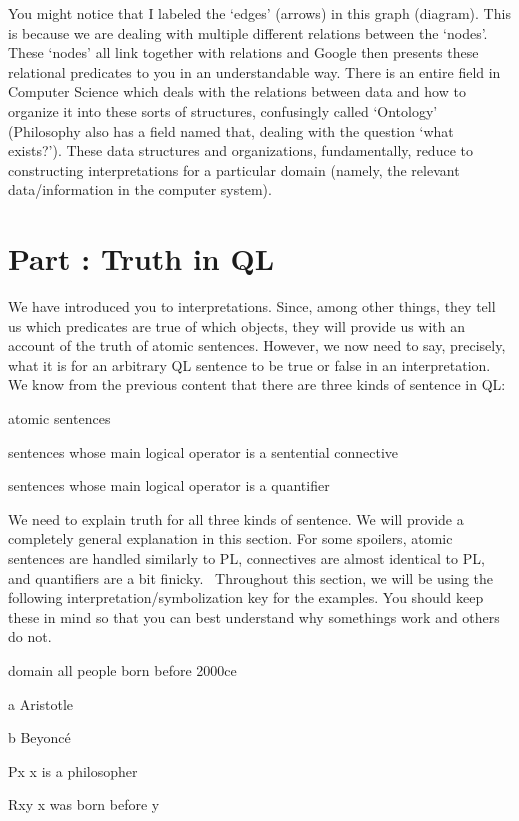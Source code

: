 You might notice that I labeled the `edges' (arrows) in this graph (diagram). This is because we are dealing with multiple different relations between the `nodes'. These `nodes' all link together with relations and Google then presents these relational predicates to you in an understandable way. There is an entire field in Computer Science which deals with the relations between data and how to organize it into these sorts of structures, confusingly called `Ontology' (Philosophy also has a field named that, dealing with the question `what exists?'). These data structures and organizations, fundamentally, reduce to constructing interpretations for a particular domain (namely, the relevant data/information in the computer system).   
\setcounter{seccount}{1}
\chapter{Part \thechapcount: Truth in QL}
We have introduced you to interpretations. Since, among other things, they tell us which predicates are true of which objects, they will provide us with an account of the truth of atomic sentences. However, we now need to say, precisely, what it is for an arbitrary QL sentence to be true or false in an interpretation. We know from the previous content that there are three kinds of sentence in QL:
\begin{ebullet}
\item[\textbullet]atomic sentences
\item[\textbullet]sentences whose main logical operator is a sentential connective 
\item[\textbullet]sentences whose main logical operator is a quantifier
\end{ebullet}
We need to explain truth for all three kinds of sentence. We will provide a completely general explanation in this section. For some spoilers, atomic sentences are handled similarly to PL, connectives are almost identical to PL, and quantifiers are a bit finicky.  Throughout this section, we will be using the following interpretation/symbolization key for the examples. You should keep these in mind so that you can best understand why somethings work and others do not. 
\begin{ekey}
\item[domain] all people born before 2000ce
\item[a] Aristotle
\item[b] Beyoncé
\item[Px] x is a philosopher
\item[Rxy] x was born before y
\end{ekey}
